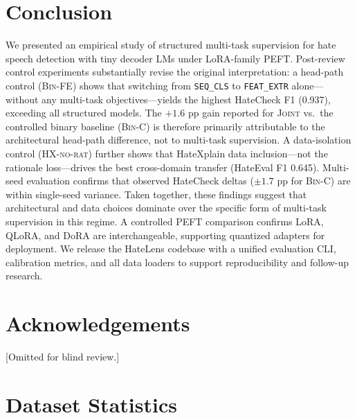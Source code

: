 \documentclass{article}
\newcommand{\method}{HateLens}
\begin{document}
\section{Conclusion}
\label{sec:conclusion}

We presented an empirical study of structured multi-task supervision for hate
speech detection with tiny decoder LMs under LoRA-family PEFT.
Post-review control experiments substantially revise the original interpretation:
a head-path control (\textsc{Bin-FE}) shows that switching from \texttt{SEQ\_CLS}
to \texttt{FEAT\_EXTR} alone—without any multi-task objectives—yields the highest
HateCheck F1 (0.937), exceeding all structured models.
The $+1.6$ pp gain reported for \textsc{Joint} vs.\ the controlled binary
baseline (\textsc{Bin-C}) is therefore primarily attributable to the
architectural head-path difference, not to multi-task supervision.
A data-isolation control (\textsc{HX-no-rat}) further shows that HateXplain
data inclusion—not the rationale loss—drives the best cross-domain transfer
(HateEval F1 0.645).
Multi-seed evaluation confirms that observed HateCheck deltas ($\pm 1.7$ pp
for \textsc{Bin-C}) are within single-seed variance.
Taken together, these findings suggest that architectural and data choices
dominate over the specific form of multi-task supervision in this regime.
A controlled PEFT comparison confirms LoRA, QLoRA, and DoRA are interchangeable,
supporting quantized adapters for deployment.
We release the \method{} codebase with a unified evaluation CLI, calibration
metrics, and all data loaders to support reproducibility and follow-up research.

\section*{Acknowledgements}
[Omitted for blind review.]




\appendix

\section{Dataset Statistics}
\label{app:data}
\end{document}

